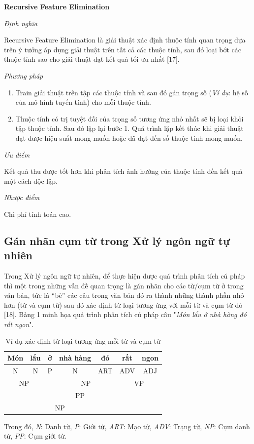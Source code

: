 \documentclass[12pt]{extarticle}
\begin{document}
			\par \textbf{Recursive Feature Elimination}
				\par \textit{Định nghĩa} 
				\par Recursive Feature Elimination là giải thuật xác định thuộc tính quan trọng dựa trên ý tưởng áp dụng giải thuật trên tất cả các thuộc tính, sau đó loại bớt các thuộc tính sao cho giải thuật đạt kết quả tối ưu nhất [17].
				\par \textit{Phương pháp}
				\begin{enumerate}
					\item Train giải thuật trên tập các thuộc tính và sau đó gán trọng số (\textit{Ví dụ}: hệ số của mô hình tuyến tính) cho mỗi thuộc tính.
					\item Thuộc tính có trị tuyệt đối của trọng số tương ứng nhỏ nhất sẽ bị loại khỏi tập thuộc tính. Sau đó lặp lại bước 1. Quá trình lặp kết thúc khi giải thuật đạt được hiệu suất mong muốn hoặc đã đạt đến số thuộc tính mong muốn.

				\end{enumerate}
				\par  \textit{Ưu điểm}
				\par Kết quả thu được tốt hơn khi phân tích ảnh hưởng của thuộc tính đến kết quả một cách độc lập.
				\par  \textit{Nhược điểm}
				\par Chi phí tính toán cao.		
		\subsection{Gán nhãn cụm từ trong Xử lý ngôn ngữ tự nhiên}
			\par Trong Xử lý ngôn ngữ tự nhiên, để thực hiện được quá trình phân tích cú pháp thì một trong những vấn đề quan trọng là gán nhãn cho các từ/cụm từ ở trong văn bản, tức là “bẻ” các câu trong văn bản đó ra thành những thành phần nhỏ hơn (từ và cụm từ) sau đó xác định từ loại tương ứng với mỗi từ và cụm từ đó [18]. Bảng 1 minh họa quá trình phân tích cú pháp câu "\textit{Món lẩu ở nhà hàng đó rất ngon}".
			\begin{table}[h]
				\centering
				\caption{Ví dụ xác định từ loại tương ứng mỗi từ và cụm từ}
				\label{my-label}
				\begin{tabular}{|c|c|c|c|c|c|c|}
				\hline
           				Món &   lẩu        &  ở &  nhà hàng          &  đó          &       rất     & ngon           \\ \hline
          					N & N          & P  &    N       &       ART    &     ADV      &     ADJ      \\ \hline
				\multicolumn{2}{|c|}{NP} &  & \multicolumn{2}{c|}{NP} &  \multicolumn{2}{c|}{VP} \\ \hline
				\multicolumn{2}{|c|}{} & \multicolumn{3}{c|}{PP}    &           &           \\ \hline
				\multicolumn{5}{|c|}{NP}                          &           &           \\ \hline
				\end{tabular}
			\end{table}
			\par Trong đó, \textit{N}: Danh từ,  \textit{P}: Giới từ,  \textit{ART}: Mạo từ,  \textit{ADV}: Trạng từ,  \textit{NP}: Cụm danh từ,  \textit{PP}: Cụm giới từ.
\end{document}
